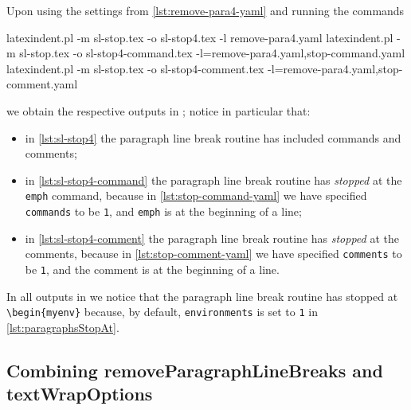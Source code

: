	Upon using the settings from \vref{lst:remove-para4-yaml} and running the commands
	\begin{widepage}
		\begin{commandshell}
latexindent.pl -m sl-stop.tex -o sl-stop4.tex -l remove-para4.yaml
latexindent.pl -m sl-stop.tex -o sl-stop4-command.tex -l=remove-para4.yaml,stop-command.yaml
latexindent.pl -m sl-stop.tex -o sl-stop4-comment.tex -l=remove-para4.yaml,stop-comment.yaml
\end{commandshell}
	\end{widepage}
	we obtain the respective outputs in ; notice in particular
	that:
	\begin{itemize}
		\item in \cref{lst:sl-stop4} the paragraph line break routine has included commands and
		      comments;
		\item in \cref{lst:sl-stop4-command} the paragraph line break routine has
		      \emph{stopped} at the \texttt{emph} command, because in
		      \cref{lst:stop-command-yaml} we have specified \texttt{commands} to be
		      \texttt{1}, and \texttt{emph} is at the beginning of a
		      line;
		\item in \cref{lst:sl-stop4-comment} the paragraph line break routine has
		      \emph{stopped} at the comments, because in \cref{lst:stop-comment-yaml} we
		      have specified \texttt{comments} to be \texttt{1}, and the
		      comment is at the beginning of a line.
	\end{itemize}
	In all outputs in  we notice that the paragraph line break
	routine has stopped at \lstinline!\begin{myenv}! because, by default,
	\texttt{environments} is set to \texttt{1} in
	\vref{lst:paragraphsStopAt}.


\subsection{Combining removeParagraphLineBreaks and textWrapOptions}\label{subsec:removeparagraphlinebreaks:and:textwrap}

